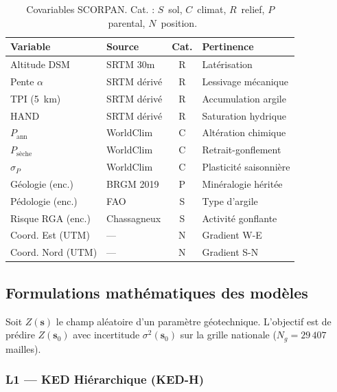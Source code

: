 \documentclass[10pt,a4paper,twocolumn]{article}
\newcommand{\bs}{\mathbf{s}}
\begin{document}
\begin{table}[htbp]
\centering\small
\caption{Covariables SCORPAN. Cat. : $S$~sol, $C$~climat, $R$~relief,
  $P$~parental, $N$~position.}
\label{tab:covariables}
\setlength{\tabcolsep}{4pt}
\begin{tabular}{@{}l@{\,}l@{\,}c@{\,}l@{}}
\toprule
Variable & Source & Cat. & Pertinence \\
\midrule
Altitude DSM        & SRTM 30m   & R & Latérisation \\
Pente $\alpha$      & SRTM dérivé& R & Lessivage mécanique \\
TPI (5~km)         & SRTM dérivé& R & Accumulation argile \\
HAND                & SRTM dérivé& R & Saturation hydrique \\
$P_{\mathrm{ann}}$  & WorldClim  & C & Altération chimique \\
$P_{\mathrm{sèche}}$& WorldClim  & C & Retrait-gonflement \\
$\sigma_P$          & WorldClim  & C & Plasticité saisonnière \\
Géologie (enc.)     & BRGM 2019  & P & Minéralogie héritée \\
Pédologie (enc.)    & FAO        & S & Type d'argile \\
Risque RGA (enc.)   & Chassagneux& S & Activité gonflante \\
Coord. Est (UTM)    & —          & N & Gradient W-E \\
Coord. Nord (UTM)   & —          & N & Gradient S-N \\
\bottomrule
\end{tabular}
\end{table}

\subsection{Formulations mathématiques des modèles}
\label{sec:modeles}

Soit $Z(\bs)$ le champ aléatoire d'un paramètre géotechnique.
L'objectif est de prédire $Z(\bs_0)$ avec incertitude $\sigma^2(\bs_0)$
sur la grille nationale ($N_g = 29\,407$ mailles).

\subsubsection{L1 — KED Hiérarchique (KED-H)}
\label{subsec:ked}
\end{document}
